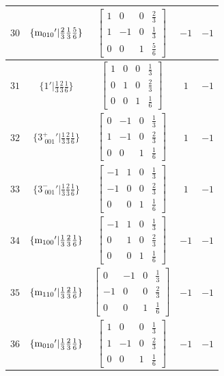 \documentclass[fleqn,8pt]{jsarticle}
\begin{document}
\begin{longtable}{ccccc}
$ 30 $ & $ \{{\rm m}_{010}{}'|\frac{2}{3} \frac{1}{3} \frac{5}{6}\} $ & $ \begin{bmatrix} 1 & 0 & 0 & \frac{2}{3} \\ 1 & -1 & 0 & \frac{1}{3} \\ 0 & 0 & 1 & \frac{5}{6} \end{bmatrix} $ & $ -1 $ & $ -1 $ \\ \hline
$ 31 $ & $ \{1{}'|\frac{1}{3} \frac{2}{3} \frac{1}{6}\} $ & $ \begin{bmatrix} 1 & 0 & 0 & \frac{1}{3} \\ 0 & 1 & 0 & \frac{2}{3} \\ 0 & 0 & 1 & \frac{1}{6} \end{bmatrix} $ & $ 1 $ & $ -1 $ \\ \hline
$ 32 $ & $ \{3^{+}_{\,\,001}{}'|\frac{1}{3} \frac{2}{3} \frac{1}{6}\} $ & $ \begin{bmatrix} 0 & -1 & 0 & \frac{1}{3} \\ 1 & -1 & 0 & \frac{2}{3} \\ 0 & 0 & 1 & \frac{1}{6} \end{bmatrix} $ & $ 1 $ & $ -1 $ \\ \hline
$ 33 $ & $ \{3^{-}_{\,\,001}{}'|\frac{1}{3} \frac{2}{3} \frac{1}{6}\} $ & $ \begin{bmatrix} -1 & 1 & 0 & \frac{1}{3} \\ -1 & 0 & 0 & \frac{2}{3} \\ 0 & 0 & 1 & \frac{1}{6} \end{bmatrix} $ & $ 1 $ & $ -1 $ \\ \hline
$ 34 $ & $ \{{\rm m}_{100}{}'|\frac{1}{3} \frac{2}{3} \frac{1}{6}\} $ & $ \begin{bmatrix} -1 & 1 & 0 & \frac{1}{3} \\ 0 & 1 & 0 & \frac{2}{3} \\ 0 & 0 & 1 & \frac{1}{6} \end{bmatrix} $ & $ -1 $ & $ -1 $ \\ \hline
$ 35 $ & $ \{{\rm m}_{110}{}'|\frac{1}{3} \frac{2}{3} \frac{1}{6}\} $ & $ \begin{bmatrix} 0 & -1 & 0 & \frac{1}{3} \\ -1 & 0 & 0 & \frac{2}{3} \\ 0 & 0 & 1 & \frac{1}{6} \end{bmatrix} $ & $ -1 $ & $ -1 $ \\ \hline
$ 36 $ & $ \{{\rm m}_{010}{}'|\frac{1}{3} \frac{2}{3} \frac{1}{6}\} $ & $ \begin{bmatrix} 1 & 0 & 0 & \frac{1}{3} \\ 1 & -1 & 0 & \frac{2}{3} \\ 0 & 0 & 1 & \frac{1}{6} \end{bmatrix} $ & $ -1 $ & $ -1 $ \\
\end{longtable}
\end{document}
